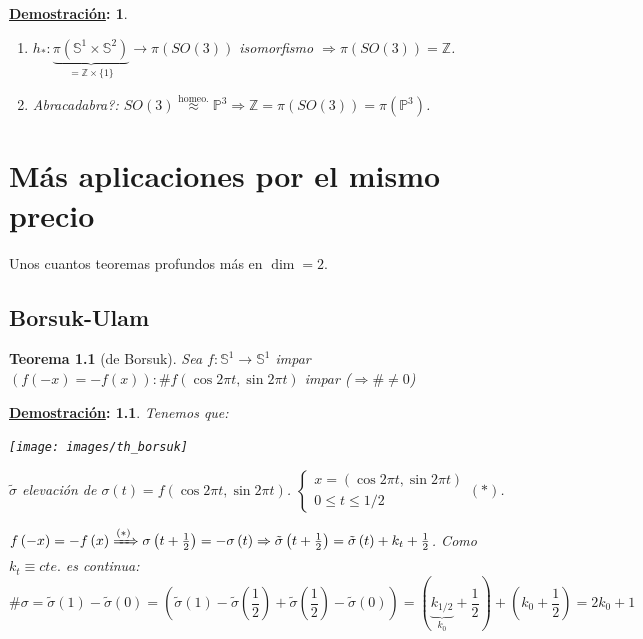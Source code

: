 \documentclass[10pt,a4paper,openright]{book}
\theoremstyle{break}
\newtheorem*{theo}{Teorema}
\newtheorem*{demo}{\underline{Demostración}:}
\begin{document}
\begin{demo}
\begin{enumerate}
    \item $h_*: \underbrace{\pi\left( \mathbb{S}^{1} \times \mathbb{S}^{2} \right)}_{= \mathbb{Z} \times \{1\}} \rightarrow \pi\left( SO\left( 3 \right) \right)$ isomorfismo $\Rightarrow \pi\left( SO\left( 3 \right) \right) = \mathbb{Z}$.

    \item Abracadabra?: $SO\left( 3 \right) \stackrel{\text{homeo.}}{\approx} \mathbb{P}^{3} \Rightarrow \mathbb{Z} = \pi\left( SO\left( 3 \right) \right) = \pi \left( \mathbb{P}^{3} \right)$.
\end{enumerate}
\end{demo}


\chapter{Más aplicaciones por el mismo precio}%
\label{cha:mas_aplicaciones_por_el_mismo_precio}
Unos cuantos teoremas profundos más en $\dim = 2$.
\section{Borsuk-Ulam}%
\label{sec:borsuk_ulam}
\begin{theo}[de Borsuk]
Sea $f: \mathbb{S}^{1} \rightarrow \mathbb{S}^{1}$ impar $\left( f\left( -x \right) = -f\left( x \right) \right): \# f\left( \cos 2 \pi t, \sin 2 \pi t \right)$ impar ($\Rightarrow \# \neq 0$) 
\end{theo}
\begin{demo}
Tenemos que:
\begin{center}
    \texttt{[image: images/th\_borsuk]} 
\end{center}
$\tilde{\sigma}$ elevación de $\sigma\left( t \right) = f\left( \cos 2 \pi t, \sin 2 \pi t \right)$. $\begin{cases}
    x = \left( \cos 2 \pi t, \sin 2 \pi t \right)\\
    0 \le t \le 1/2
\end{cases} (*)$.

$f\left( -x \right) = -f\left( x \right) \xRightarrow{(*)} \sigma\left( t + \frac{1}{2} \right) = -\sigma\left( t \right) \Rightarrow \tilde{\sigma} \left( t + \frac{1}{2} \right) = \tilde{\sigma} \left( t \right) + k_t + \frac{1}{2}$. Como $k_t \equiv cte.$ es continua:
\[
    \# \sigma = \tilde{\sigma} \left( 1 \right) - \tilde{\sigma} \left( 0 \right) = \left( \tilde{\sigma} \left( 1 \right) - \tilde{\sigma}{\left( \frac{1}{2} \right)} + \tilde{\sigma} \left( \frac{1}{2} \right) - \tilde{\sigma} \left( 0 \right) \right) = \left( \underbrace{k_{1/2}}_{k_0} + \frac{1}{2} \right) + \left( k_0 + \frac{1}{2} \right) = 2k_0 + 1
\]
\end{demo}
\end{document}
